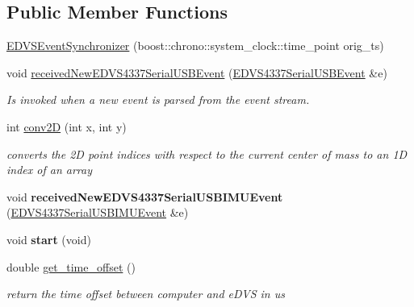 \subsection*{Public Member Functions}
\begin{DoxyCompactItemize}
\item 
\hyperlink{class_e_d_v_s_event_synchronizer_a3aa2f9f7703a260c2ee77931a41e9a5d}{E\+D\+V\+S\+Event\+Synchronizer} (boost\+::chrono\+::system\+\_\+clock\+::time\+\_\+point orig\+\_\+ts)
\item 
\hypertarget{class_e_d_v_s_event_synchronizer_abf2c8deddd912203f1028d0da0898210}{}void \hyperlink{class_e_d_v_s_event_synchronizer_abf2c8deddd912203f1028d0da0898210}{received\+New\+E\+D\+V\+S4337\+Serial\+U\+S\+B\+Event} (\hyperlink{struct_e_d_v_s4337_serial_u_s_b_event}{E\+D\+V\+S4337\+Serial\+U\+S\+B\+Event} \&e)\label{class_e_d_v_s_event_synchronizer_abf2c8deddd912203f1028d0da0898210}

\begin{DoxyCompactList}\small\item\em Is invoked when a new event is parsed from the event stream. \end{DoxyCompactList}\item 
\hypertarget{class_e_d_v_s_event_synchronizer_ae87bfda7bd247daebf8e59d0044a755b}{}int \hyperlink{class_e_d_v_s_event_synchronizer_ae87bfda7bd247daebf8e59d0044a755b}{conv2\+D} (int x, int y)\label{class_e_d_v_s_event_synchronizer_ae87bfda7bd247daebf8e59d0044a755b}

\begin{DoxyCompactList}\small\item\em converts the 2\+D point indices with respect to the current center of mass to an 1\+D index of an array \end{DoxyCompactList}\item 
\hypertarget{class_e_d_v_s_event_synchronizer_a604261b8dc3e589b6ccde5b89db2dce2}{}void {\bfseries received\+New\+E\+D\+V\+S4337\+Serial\+U\+S\+B\+I\+M\+U\+Event} (\hyperlink{struct_e_d_v_s4337_serial_u_s_b_i_m_u_event}{E\+D\+V\+S4337\+Serial\+U\+S\+B\+I\+M\+U\+Event} \&e)\label{class_e_d_v_s_event_synchronizer_a604261b8dc3e589b6ccde5b89db2dce2}

\item 
\hypertarget{class_e_d_v_s_event_synchronizer_ad6d39f82fd21ab6fee7d1afebd8eb59b}{}void {\bfseries start} (void)\label{class_e_d_v_s_event_synchronizer_ad6d39f82fd21ab6fee7d1afebd8eb59b}

\item 
\hypertarget{class_e_d_v_s_event_synchronizer_a6062d70d3ce2982494fe7dfcaa0f220a}{}double \hyperlink{class_e_d_v_s_event_synchronizer_a6062d70d3ce2982494fe7dfcaa0f220a}{get\+\_\+time\+\_\+offset} ()\label{class_e_d_v_s_event_synchronizer_a6062d70d3ce2982494fe7dfcaa0f220a}

\begin{DoxyCompactList}\small\item\em return the time offset between computer and e\+D\+V\+S in us \end{DoxyCompactList}\end{DoxyCompactItemize}
